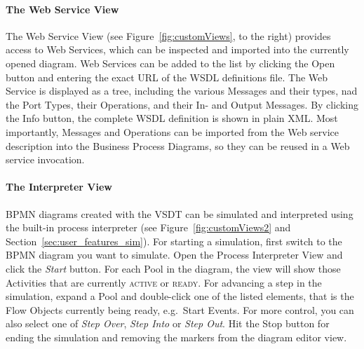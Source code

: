 
\paragraph*{The Web Service View}
The Web Service View (see Figure~\ref{fig:customViews}, to the right) provides
access to Web Services, which can be inspected and imported into the currently
opened diagram.  Web Services can be added to the list by clicking the Open button
and entering the exact URL of the WSDL definitions file.  The Web Service is
displayed as a tree, including the various Messages and their types, nad the Port
Types, their Operations, and their In- and Output Messages.  By clicking the Info
button, the complete WSDL definition is shown in plain XML.  Most importantly,
Messages and Operations can be imported from the Web service description into the
Business Process Diagrams, so they can be reused in a Web service invocation.

\paragraph*{The Interpreter View}
\label{sec:user_perspective_simView}
BPMN diagrams created with the VSDT can be simulated and interpreted using the
built-in process interpreter (see Figure~\ref{fig:customViews2} and
Section~\ref{sec:user_features_sim}).  For starting a simulation, first switch to
the BPMN diagram you want to simulate.  Open the Process Interpreter View and
click the \emph{Start} button.  For each Pool in the diagram, the view will show
those Activities that are currently \textsc{active} or \textsc{ready}.  For
advancing a step in the simulation, expand a Pool and double-click one of the
listed elements, that is the Flow Objects currently being ready, e.g.\ Start
Events.  For more control, you can also select one of \emph{Step Over}, \emph{Step
Into} or \emph{Step Out}.  Hit the Stop button for ending the simulation and
removing the markers from the diagram editor view.


